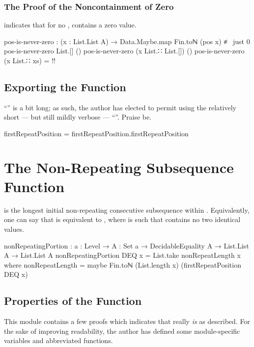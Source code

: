 \documentclass{report}
\begin{document}
\subsubsection{The Proof of the Noncontainment of Zero}
 indicates that for no ,   contains a zero value.

\begin{code}
    pos-is-never-zero :
      (x : List.List A) →
      Data.Maybe.map Fin.toℕ (pos x) ≢ just 0
    pos-is-never-zero List.[] ()
    pos-is-never-zero (x List.∷ List.[]) ()
    pos-is-never-zero (x List.∷ xs) = {!!}
\end{code}

\subsection{Exporting the Function}
``'' is a bit long; as such, the author has elected to permit using the relatively short --- but still mildly verbose --- ``''.  Praise be.

\begin{code}
firstRepeatPosition = firstRepeatPosition.firstRepeatPosition
\end{code}

\section{The Non-Repeating Subsequence Function}
   is the longest initial non-repeating consecutive subsequence within .  Equivalently, one can say that    is equivalent to   , where  is such that    contains no two identical values.

\begin{code}
nonRepeatingPortion : {a : Level} →
                      {A : Set a} →
                      DecidableEquality A →
                      List.List A →
                      List.List A
nonRepeatingPortion DEQ x = List.take nonRepeatLength x
  where nonRepeatLength = maybe Fin.toℕ (List.length x) (firstRepeatPosition DEQ x)
\end{code}

\subsection{Properties of the Function}
This module contains a few proofs which indicates that  really \emph{is} as described.  For the sake of improving readability, the author has defined some module-specific variables and abbreviated functions.
\end{document}
